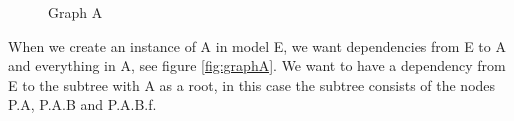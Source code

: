 \documentclass{cslthse-msc}
\begin{document}
\begin{figure}[H]
    \centering
    \qquad
    \subfloat{{}}
    \caption{Graph A}
    \label{fig:GraphA}
\end{figure}

When we create an instance of A in model E, we want dependencies from E to A and everything in A, see figure \ref{fig:graphA}. We want to have a dependency from E to the subtree with A as a root, in this case the subtree consists of the nodes P.A, P.A.B and P.A.B.f.
\end{document}
